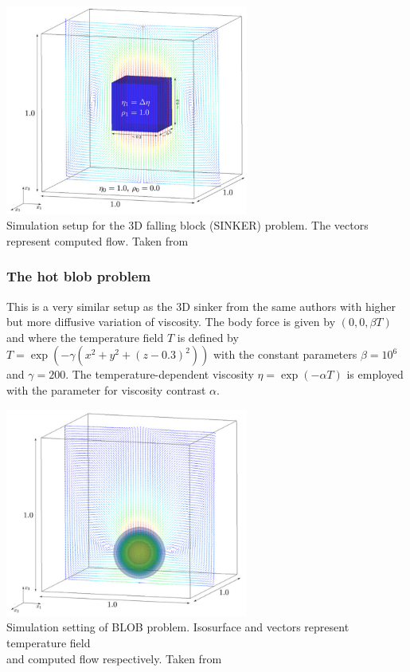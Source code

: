 \begin{center}
\includegraphics[width=8cm]{images/benchmark_sinker/fumt11}\\
{\scriptsize Simulation setup for the 3D falling block (SINKER) problem. The vectors represent computed flow.
Taken from \cite{fumt11}}
\end{center}



\subsubsection{The hot blob problem}\label{sec:hotblob}

This is a very similar setup as the 3D sinker from the same authors
with higher but more diffusive variation of viscosity.
The body force is given by $(0, 0, \beta T)$ and
where the temperature field $T$ is defined by $T = \exp  (-\gamma (x^2+y^2+(z-0.3)^2))$ 
with the constant parameters $\beta=10^6$ and $\gamma=200$. 
The temperature-dependent viscosity $\eta = \exp( -\alpha T)$ is employed with the parameter for viscosity
contrast $\alpha$.

\begin{center}
\includegraphics[width=8cm]{images/benchmark_hotblob/fumt11}\\
{\scriptsize Simulation setting of BLOB problem. Isosurface and vectors represent temperature field \\and computed flow respectively. Taken from \cite{fumt11}}
\end{center}



